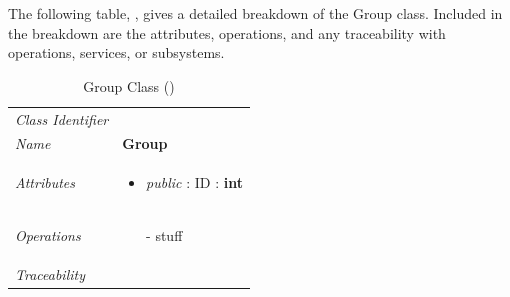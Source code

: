 \documentclass[12pt,letterpaper]{article}
\begin{document}
The following table, , gives a detailed breakdown of the Group class. Included in the breakdown are the attributes, operations, and any traceability with operations, services, or subsystems.

\begin{table}[H]
    \caption{Group Class ()} 
	\begin{tabu} to 
		\toprule
		Class Identifier &  \\
		Name & {\bf Group} \\
		Attributes & 
		\begin{minipage}[t]{\linewidth}
		    \begin{itemize}
		        \item \textit{public} : ID : \bf{int}
			\end{itemize}
	    \end{minipage} \\

		Operations &
		\begin{minipage}[t]{\linewidth}
			\begin{enumerate}
			    \item[-] stuff
	        \end{enumerate}
	    \end{minipage} \\
	    	Traceability & \\
		\toprule
	\end{tabu}
\end{table}
\end{document}
